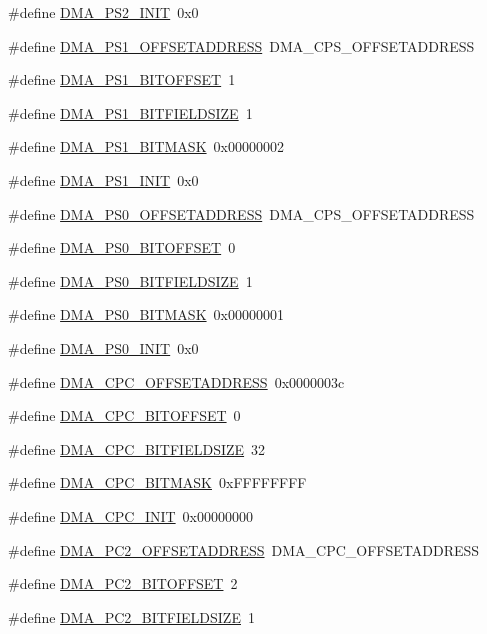 \begin{DoxyCompactItemize}
\#define \hyperlink{a00547_a4c993ea5e44be4f0180b682a95aa8e2b}{DMA\_\-PS2\_\-INIT}~0x0
\item 
\#define \hyperlink{a00547_aaafa59c050b16495d5530d0682380e87}{DMA\_\-PS1\_\-OFFSETADDRESS}~DMA\_\-CPS\_\-OFFSETADDRESS
\item 
\#define \hyperlink{a00547_ad8174403f75638ab5556d21935f255b1}{DMA\_\-PS1\_\-BITOFFSET}~1
\item 
\#define \hyperlink{a00547_a6899e55753002b5d85c721bc3ee832d0}{DMA\_\-PS1\_\-BITFIELDSIZE}~1
\item 
\#define \hyperlink{a00547_a374f7f39fd94bccc38496e571e768133}{DMA\_\-PS1\_\-BITMASK}~0x00000002
\item 
\#define \hyperlink{a00547_af7cd569bed2d5a72910feff0d9a83247}{DMA\_\-PS1\_\-INIT}~0x0
\item 
\#define \hyperlink{a00547_a2e5513883969ce188f238b95fe889c53}{DMA\_\-PS0\_\-OFFSETADDRESS}~DMA\_\-CPS\_\-OFFSETADDRESS
\item 
\#define \hyperlink{a00547_a0509ac9faa4e7810fe7e2fce18a3b491}{DMA\_\-PS0\_\-BITOFFSET}~0
\item 
\#define \hyperlink{a00547_a9c92e09941478b3ffe3b570d8c4bfcef}{DMA\_\-PS0\_\-BITFIELDSIZE}~1
\item 
\#define \hyperlink{a00547_a68cb7e1cf6a811f4f71ff2c79ed31612}{DMA\_\-PS0\_\-BITMASK}~0x00000001
\item 
\#define \hyperlink{a00547_ad301b17707fb742f1438c755cee96ee0}{DMA\_\-PS0\_\-INIT}~0x0
\item 
\#define \hyperlink{a00547_aee4ad4fa572e344f5f60f98ef3a04f2e}{DMA\_\-CPC\_\-OFFSETADDRESS}~0x0000003c
\item 
\#define \hyperlink{a00547_adaf660c298b54dad3b51399247ae5da4}{DMA\_\-CPC\_\-BITOFFSET}~0
\item 
\#define \hyperlink{a00547_a7ac4c3c92092bff10cd763c503fe5777}{DMA\_\-CPC\_\-BITFIELDSIZE}~32
\item 
\#define \hyperlink{a00547_a6c781d0134dfdae9d772eb8729653b88}{DMA\_\-CPC\_\-BITMASK}~0xFFFFFFFF
\item 
\#define \hyperlink{a00547_a928380a4adf5ce1ac5b2045a9cfdaa3b}{DMA\_\-CPC\_\-INIT}~0x00000000
\item 
\#define \hyperlink{a00547_aed95caeafb0768984755ed3f1ab4a356}{DMA\_\-PC2\_\-OFFSETADDRESS}~DMA\_\-CPC\_\-OFFSETADDRESS
\item 
\#define \hyperlink{a00547_aaaf484ef479d07ffcb985d91abc294b8}{DMA\_\-PC2\_\-BITOFFSET}~2
\item 
\#define \hyperlink{a00547_ab207c60bc52ee0c47873be92b6683d45}{DMA\_\-PC2\_\-BITFIELDSIZE}~1

\end{DoxyCompactItemize}
